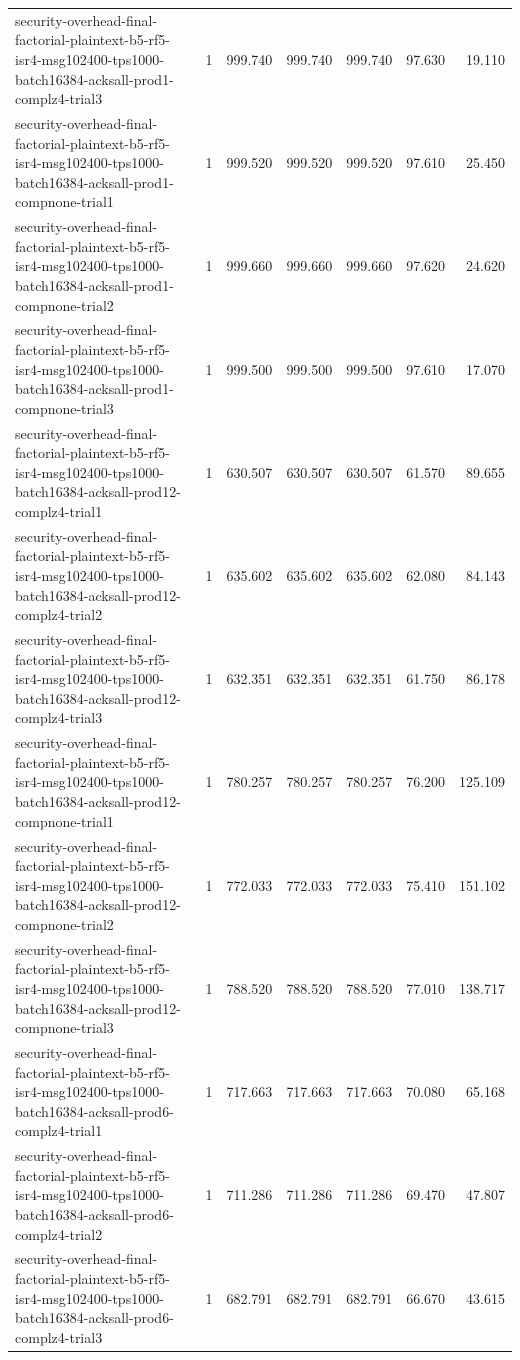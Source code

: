 \begin{tabular}{lrrrrrr}
security-overhead-final-factorial-plaintext-b5-rf5-isr4-msg102400-tps1000-batch16384-acksall-prod1-complz4-trial3 & 1 & 999.740 & 999.740 & 999.740 & 97.630 & 19.110 \\
security-overhead-final-factorial-plaintext-b5-rf5-isr4-msg102400-tps1000-batch16384-acksall-prod1-compnone-trial1 & 1 & 999.520 & 999.520 & 999.520 & 97.610 & 25.450 \\
security-overhead-final-factorial-plaintext-b5-rf5-isr4-msg102400-tps1000-batch16384-acksall-prod1-compnone-trial2 & 1 & 999.660 & 999.660 & 999.660 & 97.620 & 24.620 \\
security-overhead-final-factorial-plaintext-b5-rf5-isr4-msg102400-tps1000-batch16384-acksall-prod1-compnone-trial3 & 1 & 999.500 & 999.500 & 999.500 & 97.610 & 17.070 \\
security-overhead-final-factorial-plaintext-b5-rf5-isr4-msg102400-tps1000-batch16384-acksall-prod12-complz4-trial1 & 1 & 630.507 & 630.507 & 630.507 & 61.570 & 89.655 \\
security-overhead-final-factorial-plaintext-b5-rf5-isr4-msg102400-tps1000-batch16384-acksall-prod12-complz4-trial2 & 1 & 635.602 & 635.602 & 635.602 & 62.080 & 84.143 \\
security-overhead-final-factorial-plaintext-b5-rf5-isr4-msg102400-tps1000-batch16384-acksall-prod12-complz4-trial3 & 1 & 632.351 & 632.351 & 632.351 & 61.750 & 86.178 \\
security-overhead-final-factorial-plaintext-b5-rf5-isr4-msg102400-tps1000-batch16384-acksall-prod12-compnone-trial1 & 1 & 780.257 & 780.257 & 780.257 & 76.200 & 125.109 \\
security-overhead-final-factorial-plaintext-b5-rf5-isr4-msg102400-tps1000-batch16384-acksall-prod12-compnone-trial2 & 1 & 772.033 & 772.033 & 772.033 & 75.410 & 151.102 \\
security-overhead-final-factorial-plaintext-b5-rf5-isr4-msg102400-tps1000-batch16384-acksall-prod12-compnone-trial3 & 1 & 788.520 & 788.520 & 788.520 & 77.010 & 138.717 \\
security-overhead-final-factorial-plaintext-b5-rf5-isr4-msg102400-tps1000-batch16384-acksall-prod6-complz4-trial1 & 1 & 717.663 & 717.663 & 717.663 & 70.080 & 65.168 \\
security-overhead-final-factorial-plaintext-b5-rf5-isr4-msg102400-tps1000-batch16384-acksall-prod6-complz4-trial2 & 1 & 711.286 & 711.286 & 711.286 & 69.470 & 47.807 \\
security-overhead-final-factorial-plaintext-b5-rf5-isr4-msg102400-tps1000-batch16384-acksall-prod6-complz4-trial3 & 1 & 682.791 & 682.791 & 682.791 & 66.670 & 43.615 \\

\end{tabular}
